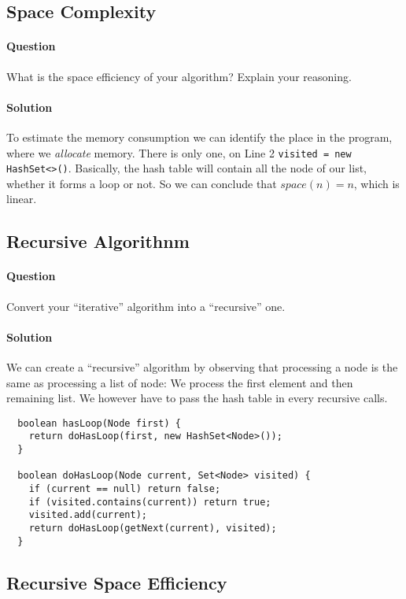 \documentclass{article}
\begin{document}
\subsection{Space Complexity}
\paragraph{Question} What is the space efficiency of your algorithm?
Explain your reasoning.

\paragraph{Solution} To estimate the memory consumption we can
identify the place in the program, where we \emph{allocate}
memory. There is only one, on Line 2 \texttt{visited = new
  HashSet<>()}. Basically, the hash table will contain all the node of
our list, whether it forms a loop or not. So we can conclude that
$space(n) = n$, which is linear.


\subsection{Recursive Algorithnm}
\paragraph{Question} Convert your ``iterative'' algorithm into a ``recursive'' one.

\paragraph{Solution}
We can create a ``recursive'' algorithm by observing that processing a
node is the same as processing a list of node: We process the first
element and then remaining list. We however have to pass the hash
table in every recursive calls.

\begin{verbatim}
  boolean hasLoop(Node first) {
    return doHasLoop(first, new HashSet<Node>());
  }
  
  boolean doHasLoop(Node current, Set<Node> visited) {
    if (current == null) return false;
    if (visited.contains(current)) return true;
    visited.add(current);
    return doHasLoop(getNext(current), visited);
  }
\end{verbatim}

\subsection{Recursive Space Efficiency}
\end{document}
